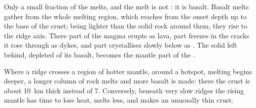 Only a small fraction of the  melts, and the melt is not :
it is basalt. Basalt melts gather from the whole melting region, which reaches
from the onset depth up to the base of the crust; being lighter than the solid
rock around them, they rise to the ridge axis. There part of the magma erupts
as lava, part freezes in the cracks it rose through as dykes, and part
crystallises slowly below as . The solid  left behind,
depleted of its basalt, becomes the mantle part of the .

Where a ridge crosses a region of hotter mantle, around a hotspot, melting
begins deeper, a longer column of rock melts and more basalt is made: there
the crust is about \qty{10}{km} thick instead of 7. Conversely, beneath very
slow ridges the rising mantle has time to lose heat, melts less, and makes an
unusually thin crust.

